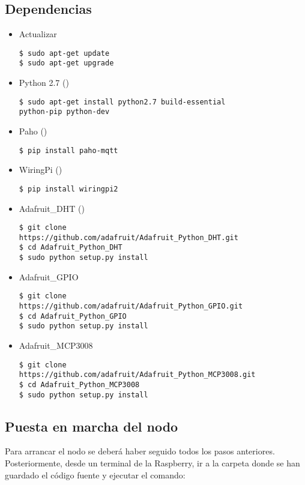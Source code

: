 \subsection{Dependencias}
\label{makereference7.1.4}
	\begin{itemize}
		\item Actualizar
\lstset{language=bash}
\begin{lstlisting}[frame=single]
$ sudo apt-get update
$ sudo apt-get upgrade
\end{lstlisting}
		\item Python 2.7 (\cite{ARP:Python:2017})
\begin{lstlisting}[frame=single]
$ sudo apt-get install python2.7 build-essential 
python-pip python-dev
\end{lstlisting}
		\item Paho (\cite{ARP:Paho:2017})
\begin{lstlisting}[frame=single]
$ pip install paho-mqtt
\end{lstlisting}
		\item WiringPi (\cite{ARP:Wiring:2017})
\begin{lstlisting}[frame=single]
$ pip install wiringpi2
\end{lstlisting}
		\item Adafruit\_DHT (\cite{ARP:Adafruit:2017})
\begin{lstlisting}[frame=single]
$ git clone 
https://github.com/adafruit/Adafruit_Python_DHT.git
$ cd Adafruit_Python_DHT
$ sudo python setup.py install
\end{lstlisting}
		\item Adafruit\_GPIO
\begin{lstlisting}[frame=single]
$ git clone 
https://github.com/adafruit/Adafruit_Python_GPIO.git
$ cd Adafruit_Python_GPIO
$ sudo python setup.py install
\end{lstlisting}
		\item Adafruit\_MCP3008
\begin{lstlisting}[frame=single]
$ git clone 
https://github.com/adafruit/Adafruit_Python_MCP3008.git
$ cd Adafruit_Python_MCP3008
$ sudo python setup.py install
\end{lstlisting}
	\end{itemize}

\subsection{Puesta en marcha del nodo}
\label{makereference7.1.5}
Para arrancar el nodo se deberá haber seguido todos los pasos anteriores. Posteriormente, desde un terminal de la Raspberry, ir a la carpeta donde se han guardado el código fuente y ejecutar el comando: 

